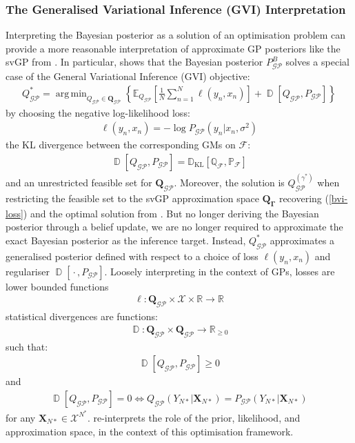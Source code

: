 \documentclass{article}
\newcommand{\KLD}{\operatorname{\mathbb{D}_{KL}}}
\newcommand{\D}{\operatorname{\mathbb{D}}}
\newcommand{\GP}{\operatorname{\mathcal{GP}}}
\newcommand{\wc}{\operatorname{{}\cdot{}}}
\DeclareMathOperator*{\argmin}{arg\,min}
\numberwithin{equation}{section}
\begin{document}
\subsubsection{The Generalised Variational Inference (GVI) Interpretation}
Interpreting the Bayesian posterior as a solution of an optimisation problem can provide a more reasonable interpretation of approximate GP posteriors like the svGP from \cite{titsias2009variational}. In particular, \cite{knoblauch2022optimization} shows that the Bayesian posterior $P_{\GP}^B$ solves a special case of the General Variational Inference (GVI) objective:
\begin{align}
Q_{\GP}^* = \argmin_{Q_{\GP} \in \boldsymbol{Q}_{\GP}} \left\{ \mathbb{E}_{Q_{\GP}}\left[\frac{1}{N}\sum_{n=1}^N \ell(y_n, x_n)\right] + \D\left[Q_{\GP}, P_{\GP}\right]\right\}
\label{general-posterior}
\end{align}
by choosing the negative log-likelihood loss:
\begin{align}
    \ell(y_n, x_n) = -\log P_{\GP}\left(y_n \vert x_n, \sigma^2\right)
\end{align}
the KL divergence between the corresponding GMs on $\mathcal{F}$:
\begin{align}
    \D\left[Q_{\GP}, P_{\GP}\right] = \KLD\left[\mathbb{Q}_{\mathcal{F}}, \mathbb{P}_{\mathcal{F}}\right]
\end{align}
and an unrestricted feasible set for $\boldsymbol{Q}_{\GP}$. Moreover, the solution is $Q_{\GP}^{(\gamma^*)}$ when restricting the feasible set to the svGP approximation space $\boldsymbol{Q}_{\boldsymbol{\Gamma}}$ recovering (\ref{bvi-loss}) and the optimal solution from \cite{titsias2009variational}. But no longer deriving the Bayesian posterior through a belief update, we are no longer required to approximate the exact Bayesian posterior as the inference target. Instead, $Q_{\GP}^*$ approximates a generalised posterior defined with respect to a choice of loss $\ell(y_n, x_n)$ and regulariser $\D\left[\wc, P_{\GP}\right]$. Loosely interpreting \cite{knoblauch2022optimization} in the context of GPs, losses are lower bounded functions 
\begin{align}
    \ell: \boldsymbol{Q}_{\GP} \times \mathcal{X} \times \mathbb{R} \rightarrow \mathbb{R}
    \label{loss-definition}
\end{align}
statistical divergences are functions:
\begin{align}
    \D: \boldsymbol{Q}_{\GP} \times \boldsymbol{Q}_{\GP} \rightarrow \mathbb{R}_{\geq0}
\end{align} such that:
\begin{align}
    \D\left[Q_{\GP}, P_{\GP}\right] \geq 0
\end{align} 
and 
\begin{align}
    \D\left[Q_{\GP}, P_{\GP}\right] = 0 \Leftrightarrow Q_{\GP}(Y_{N*} \vert \mathbf{X}_{N*}) = P_{\GP}(Y_{N*} \vert \mathbf{X}_{N*})
\end{align}
for any $\mathbf{X}_{N*} \in \mathcal{X}^{N^*}$. \cite{knoblauch2022optimization} re-interprets the role of the prior, likelihood, and approximation space, in the context of this optimisation framework.
\end{document}
